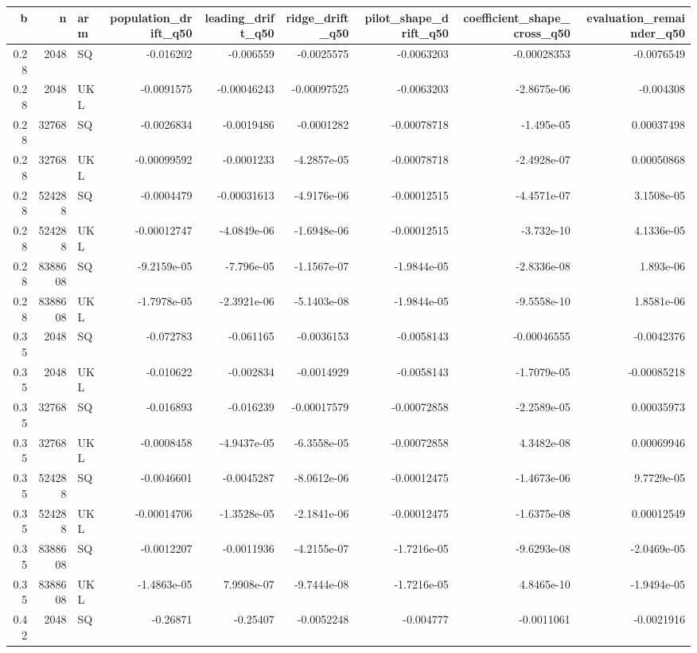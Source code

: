 \begin{tabular}{rrlrrrrrr}
\toprule
b & n & arm & population_drift_q50 & leading_drift_q50 & ridge_drift_q50 & pilot_shape_drift_q50 & coefficient_shape_cross_q50 & evaluation_remainder_q50 \\
\midrule
0.28 & 2048 & SQ & -0.016202 & -0.006559 & -0.0025575 & -0.0063203 & -0.00028353 & -0.0076549 \\
0.28 & 2048 & UKL & -0.0091575 & -0.00046243 & -0.00097525 & -0.0063203 & -2.8675e-06 & -0.004308 \\
0.28 & 32768 & SQ & -0.0026834 & -0.0019486 & -0.0001282 & -0.00078718 & -1.495e-05 & 0.00037498 \\
0.28 & 32768 & UKL & -0.00099592 & -0.0001233 & -4.2857e-05 & -0.00078718 & -2.4928e-07 & 0.00050868 \\
0.28 & 524288 & SQ & -0.0004479 & -0.00031613 & -4.9176e-06 & -0.00012515 & -4.4571e-07 & 3.1508e-05 \\
0.28 & 524288 & UKL & -0.00012747 & -4.0849e-06 & -1.6948e-06 & -0.00012515 & -3.732e-10 & 4.1336e-05 \\
0.28 & 8388608 & SQ & -9.2159e-05 & -7.796e-05 & -1.1567e-07 & -1.9844e-05 & -2.8336e-08 & 1.893e-06 \\
0.28 & 8388608 & UKL & -1.7978e-05 & -2.3921e-06 & -5.1403e-08 & -1.9844e-05 & -9.5558e-10 & 1.8581e-06 \\
0.35 & 2048 & SQ & -0.072783 & -0.061165 & -0.0036153 & -0.0058143 & -0.00046555 & -0.0042376 \\
0.35 & 2048 & UKL & -0.010622 & -0.002834 & -0.0014929 & -0.0058143 & -1.7079e-05 & -0.00085218 \\
0.35 & 32768 & SQ & -0.016893 & -0.016239 & -0.00017579 & -0.00072858 & -2.2589e-05 & 0.00035973 \\
0.35 & 32768 & UKL & -0.0008458 & -4.9437e-05 & -6.3558e-05 & -0.00072858 & 4.3482e-08 & 0.00069946 \\
0.35 & 524288 & SQ & -0.0046601 & -0.0045287 & -8.0612e-06 & -0.00012475 & -1.4673e-06 & 9.7729e-05 \\
0.35 & 524288 & UKL & -0.00014706 & -1.3528e-05 & -2.1841e-06 & -0.00012475 & -1.6375e-08 & 0.00012549 \\
0.35 & 8388608 & SQ & -0.0012207 & -0.0011936 & -4.2155e-07 & -1.7216e-05 & -9.6293e-08 & -2.0469e-05 \\
0.35 & 8388608 & UKL & -1.4863e-05 & 7.9908e-07 & -9.7444e-08 & -1.7216e-05 & 4.8465e-10 & -1.9494e-05 \\
0.42 & 2048 & SQ & -0.26871 & -0.25407 & -0.0052248 & -0.004777 & -0.0011061 & -0.0021916 \\

\end{tabular}
